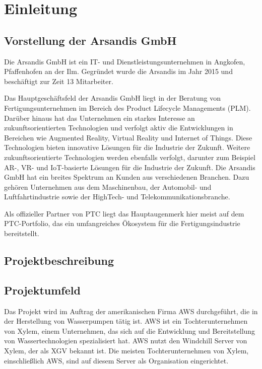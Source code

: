\section{Einleitung}
\label{sec:Einleitung}

\subsection{Vorstellung der Arsandis GmbH}
\label{sec:Vorstellung_Arsandis}
Die Arsandis GmbH ist ein IT- und Dienstleistungsunternehmen in Angkofen, Pfaffenhofen an der Ilm.
Gegründet wurde die Arsandis im Jahr 2015 und beschäftigt zur Zeit 13 Mitarbeiter.

Das Hauptgeschäftsfeld der Arsandis GmbH liegt in der Beratung von Fertigungsunternehmen im Bereich des Product Lifecycle Managements (PLM).
Darüber hinaus hat das Unternehmen ein starkes Interesse an zukunftsorientierten Technologien und verfolgt aktiv die Entwicklungen in Bereichen wie Augmented Reality, Virtual Reality und Internet of Things.
Diese Technologien bieten innovative Lösungen für die Industrie der Zukunft.
Weitere zukunftsorientierte Technologien werden ebenfalls verfolgt, darunter zum Beispiel AR-, VR- und IoT-basierte Lösungen für die Industrie der Zukunft.
Die Arsandis GmbH hat ein breites Spektrum an Kunden aus verschiedenen Branchen.
Dazu gehören Unternehmen aus dem Maschinenbau, der Automobil- und Luftfahrtindustrie sowie der HighTech- und Telekommunikationsbranche.

Als offizieller Partner von PTC liegt das Hauptaugenmerk hier meist auf dem PTC-Portfolio, das ein umfangreiches Ökosystem für die Fertigungsindustrie bereitstellt.

\subsection{Projektbeschreibung}
\label{subsec:Projektbeschreibung}

\subsection{Projektumfeld}
\label{sec:Projektumfeld}
Das Projekt wird im Auftrag der amerikanischen Firma \ac{AWS} durchgeführt, die in der Herstellung von Wasserpumpen tätig ist.
\ac{AWS} ist ein Tochterunternehmen von Xylem, einem Unternehmen, das sich auf die Entwicklung und Bereitstellung von Wassertechnologien spezialisiert hat.
\ac{AWS} nutzt den Windchill Server von Xylem, der als \ac{XGV} bekannt ist.
Die meisten Tochterunternehmen von Xylem, einschließlich \ac{AWS}, sind auf diesem Server als Organisation eingerichtet.

